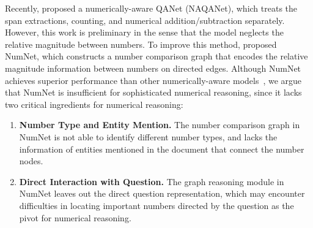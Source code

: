 \documentclass{article}
\begin{document}
Recently, \citet{DBLP:conf/naacl/DuaWDSS019} proposed a numerically-aware QANet (NAQANet), which treats the span extractions, counting, and numerical addition/subtraction separately.
However, this work is preliminary in the sense that the model neglects the relative magnitude between numbers.
To improve this method, \citet{DBLP:conf/emnlp/RanLLZL19} proposed NumNet, which constructs a number comparison graph that encodes the relative magnitude information between numbers on directed edges.
Although NumNet achieves superior performance than other numerically-aware models~\cite{hu-etal-2019-multi,DBLP:conf/emnlp/AndorHLP19,ggb2020injecting,DBLP:conf/iclr/ChenLYZSL20}, we argue that NumNet is insufficient for sophisticated numerical reasoning, since it lacks two critical ingredients for numerical reasoning:
\begin{enumerate}[leftmargin=*,nolistsep,nosep]
\setlength\itemsep{0.5em}
    \item \textbf{Number Type and Entity Mention.} The number comparison graph in NumNet is not able to identify different number types, and lacks the information of entities mentioned in the document that connect the number nodes.
    \item \textbf{Direct Interaction with Question.} The graph reasoning module in NumNet leaves out the direct question representation, which may encounter difficulties in locating important numbers directed by the question as the pivot for numerical reasoning.\end{enumerate}
    
\end{document}
